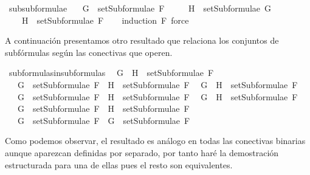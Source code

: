 \begin{isabellebody}
\isamarkupfalse%
%
\endisatagproof
{\isafoldproof}%
%
\isadelimproof
\isanewline
%
\endisadelimproof
\isanewline
{}\isamarkupfalse%
\ subsubformulae{\isacharcolon}\ \isanewline
\ \ {\isachardoublequoteopen}G\ {\isasymin}\ setSubformulae\ F\ \isanewline
\ \ \ {\isasymLongrightarrow}\ H\ {\isasymin}\ setSubformulae\ G\ \isanewline
\ \ \ {\isasymLongrightarrow}\ H\ {\isasymin}\ setSubformulae\ F{\isachardoublequoteclose}\isanewline
%
\isadelimproof
\ \ %
\endisadelimproof
%
\isatagproof
{}\isamarkupfalse%
\ {\isacharparenleft}induction\ F{\isacharsemicolon}\ force{\isacharparenright}%
\endisatagproof
{\isafoldproof}%
%
\isadelimproof
%
\endisadelimproof
%
\begin{isamarkuptext}%
A continuación presentamos otro resultado que relaciona los 
  conjuntos de subfórmulas según las conectivas que operen.%
\end{isamarkuptext}\isamarkuptrue%
\isamarkupfalse%
\ subformulas{\isacharunderscore}in{\isacharunderscore}subformulas{\isacharcolon}\isanewline
\ \ {\isachardoublequoteopen}G\ \isactrlbold {\isasymand}\ H\ {\isasymin}\ setSubformulae\ F\ \isanewline
\ \ {\isasymLongrightarrow}\ G\ {\isasymin}\ setSubformulae\ F\ {\isasymand}\ H\ {\isasymin}\ setSubformulae\ F{\isachardoublequoteclose}\isanewline
\ \ {\isachardoublequoteopen}G\ \isactrlbold {\isasymor}\ H\ {\isasymin}\ setSubformulae\ F\ \isanewline
\ \ {\isasymLongrightarrow}\ G\ {\isasymin}\ setSubformulae\ F\ {\isasymand}\ H\ {\isasymin}\ setSubformulae\ F{\isachardoublequoteclose}\isanewline
\ \ {\isachardoublequoteopen}G\ \isactrlbold {\isasymrightarrow}\ H\ {\isasymin}\ setSubformulae\ F\ \isanewline
\ \ {\isasymLongrightarrow}\ G\ {\isasymin}\ setSubformulae\ F\ {\isasymand}\ H\ {\isasymin}\ setSubformulae\ F{\isachardoublequoteclose}\isanewline
\ \ {\isachardoublequoteopen}\isactrlbold {\isasymnot}\ G\ {\isasymin}\ setSubformulae\ F\ {\isasymLongrightarrow}\ G\ {\isasymin}\ setSubformulae\ F{\isachardoublequoteclose}\isanewline
%
\isadelimproof
\ \ %
\endisadelimproof
%
\isatagproof
{}\isamarkupfalse%
%
\endisatagproof
{\isafoldproof}%
%
\isadelimproof
%
\endisadelimproof
%
\begin{isamarkuptext}%
Como podemos observar, el resultado es análogo en todas las 
  conectivas binarias aunque aparezcan definidas por separado, por tanto 
  haré la demostración estructurada para una de ellas pues el resto son 
  equivalentes. 


\end{isamarkuptext}
\end{isabellebody}

